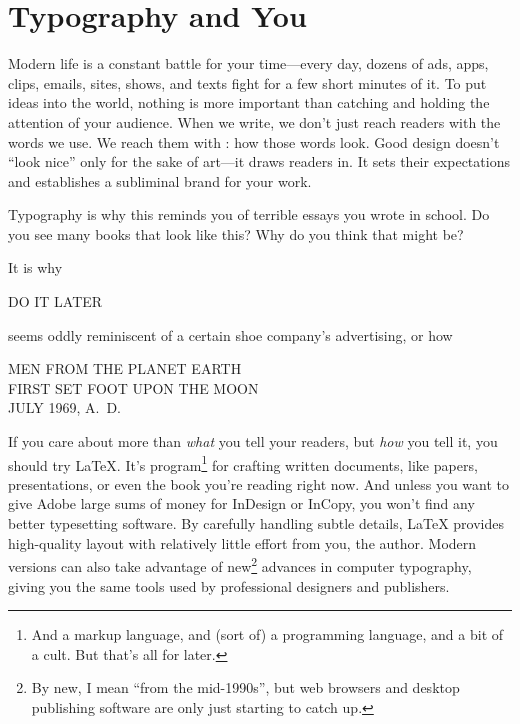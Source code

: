 \chapter{Typography and You}
\label{typography}

Modern life is a constant battle for your time---every day,
dozens of ads, apps, clips, emails, sites, shows, and texts fight
for a few short minutes of it.
To put ideas into the world,
nothing is more important than catching and holding
the attention of your audience.
When we write, we don't just reach readers with the words we use.
We reach them with : how those words look.
Good design doesn't ``look nice''
only for the sake of art---it draws readers
in.\punckern{}
It sets their expectations and establishes a subliminal brand for your
work.\punckern{}
\begin{leftfigure}
\fontsize{12pt}{24pt}\selectfont\raggedright
Typography is why this reminds you of terrible essays
you wrote in school.
Do you see many books that look like this?
Why do you think that might be?
\end{leftfigure}
\medskip

\noindent It is why
\begin{leftfigure}
\Large DO IT LATER
\end{leftfigure}
seems oddly reminiscent of a certain shoe company's advertising,
or how
\begin{center}
MEN FROM THE PLANET EARTH \\
FIRST SET FOOT UPON THE MOON \\
JULY 1969, A.~D.
\end{center}

If you care about more than \emph{what} you tell your readers, but \emph{how}
you tell it, you should try \LaTeX.
It's program\footnote{And a markup language,
and (sort of) a programming language, and a bit of a cult.
But that's all for later.}
for crafting written documents, like papers, presentations,
or even the book you're reading right now.
And unless you want to give Adobe large sums
of money for InDesign or InCopy,
you won't find any better typesetting software.
By carefully handling subtle details,
\LaTeX{} provides high-quality layout
with relatively little effort from you, the author.
Modern versions can also take advantage of new\footnote{By new,
I mean ``from the mid-1990s''\quotekern, but web browsers and desktop publishing
software are only just starting to catch up.} advances in computer typography,
giving you the same tools used by professional designers and publishers.

